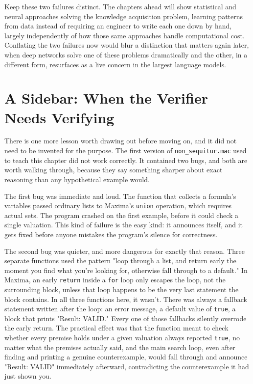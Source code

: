 Keep these two failures distinct. The chapters ahead will show statistical and neural approaches solving the knowledge acquisition problem, learning patterns from data instead of requiring an engineer to write each one down by hand, largely independently of how those same approaches handle computational cost. Conflating the two failures now would blur a distinction that matters again later, when deep networks solve one of these problems dramatically and the other, in a different form, resurfaces as a live concern in the largest language models.

\section*{A Sidebar: When the Verifier Needs Verifying}

There is one more lesson worth drawing out before moving on, and it did not need to be invented for the purpose. The first version of \texttt{non\_sequitur.mac} used to teach this chapter did not work correctly. It contained two bugs, and both are worth walking through, because they say something sharper about exact reasoning than any hypothetical example would.

The first bug was immediate and loud. The function that collects a formula's variables passed ordinary lists to Maxima's \texttt{union} operation, which requires actual sets. The program crashed on the first example, before it could check a single valuation. This kind of failure is the easy kind: it announces itself, and it gets fixed before anyone mistakes the program's silence for correctness.

The second bug was quieter, and more dangerous for exactly that reason. Three separate functions used the pattern "loop through a list, and return early the moment you find what you're looking for, otherwise fall through to a default." In Maxima, an early \texttt{return} inside a \texttt{for} loop only escapes the loop, not the surrounding block, unless that loop happens to be the very last statement the block contains. In all three functions here, it wasn't. There was always a fallback statement written after the loop: an error message, a default value of \texttt{true}, a block that prints "Result: VALID." Every one of those fallbacks silently overrode the early return. The practical effect was that the function meant to check whether every premise holds under a given valuation always reported \texttt{true}, no matter what the premises actually said, and the main search loop, even after finding and printing a genuine counterexample, would fall through and announce "Result: VALID" immediately afterward, contradicting the counterexample it had just shown you.

